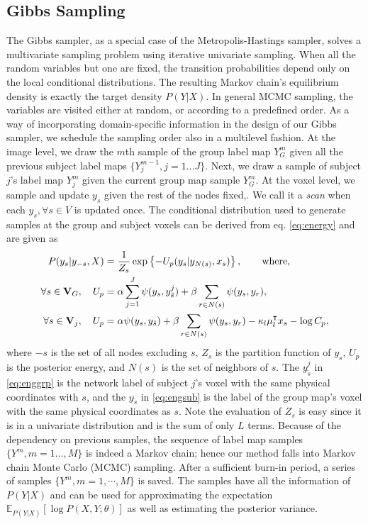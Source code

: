 \documentclass[review,authoryear]{elsarticle}
\begin{document}
\subsection{Gibbs Sampling}
The Gibbs sampler, as a special case of the Metropolis-Hastings sampler, solves
a multivariate sampling problem using iterative univariate sampling. When all
the random variables but one are fixed, the transition probabilities depend only
on the local conditional distributions. The resulting Markov chain's equilibrium
density is exactly the target density $P(Y|X)$. In general MCMC sampling, the
variables are visited either at random, or according to a predefined order. As a
way of incorporating domain-specific information in the design of our Gibbs
sampler, we schedule the sampling order also in a multilevel fashion. At the
image level, we draw the $m$th sample of the group label map $Y^m_{G}$ given all
the previous subject label maps $\{Y^{m-1}_j, j = 1\dots J\}$. Next, we draw a
sample of subject $j$'s label map $Y^m_j$ given the current group map sample
$Y^m_G$.  At the voxel level, we sample and update $y_s$ given the rest of the
nodes fixed,. We call it a \emph{scan} when each $y_s, \forall s \in V$ is
updated once. The conditional distribution used to generate samples at the group
and subject voxels can be derived from eq. \eqref{eq:energy} and are given as
\begin{align}
P(y_s | y_{-s},X) &= \frac{1}{Z_s}\exp\left\{-U_p(y_s | y_{N(s)}, x_s)\right\},  \qquad\textrm{where,} \nonumber\\
\forall s \in \text{\bf V}_G, \quad U_p &= \alpha\sum_{j=1}^J \psi(y_s, y_{\tilde s}^j) + \beta\sum_{r\in N(s)} \psi(y_s,y_r),  \label{eq:enggrp}\\
\forall s \in \text{\bf V}_j, \quad  U_p &= \alpha \psi(y_s,y_{\tilde s}) + \beta\sum_{r\in N(s)} \psi (y_s, y_r) - \kappa_l \mu_l^{\intercal} x_s - \log C_p,\label{eq:engsub}
\end{align}
where $-s$ is the set of all nodes excluding $s$, $Z_s$ is the partition
function of $y_s$, $U_p$ is the posterior energy, and $N(s)$ is the set of
neighbors of $s$.  The $y_{\tilde s}^j$ in \eqref{eq:enggrp} is the network label of
subject $j$'s voxel with the same physical coordinates with $s$, and the $y_{\tilde
  s}$ in \eqref{eq:engsub} is the label of the group map's voxel with the same
physical coordinates as $s$. Note the evaluation of $Z_s$ is easy since it is in
a univariate distribution and is the sum of only $L$ terms. Because of the
dependency on previous samples, the sequence of label map samples $\{Y^m, m =
1\dots,M\}$ is indeed a Markov chain; hence our method falls into Markov chain
Monte Carlo (MCMC) sampling.  After a sufficient burn-in period, a series of
samples $\{Y^m, m = 1, \cdots, M\}$ is saved. The samples have all the
information of $P(Y|X)$ and can be used for approximating the expectation
$\mathbb{E}_{P(Y|X)}[\log P(X,Y;\theta)]$ as well as estimating the posterior variance.
\end{document}
